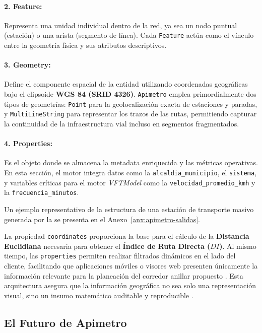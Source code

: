 \paragraph{2. Feature:} Representa una unidad individual dentro de la red, ya sea un nodo puntual (estación) o una arista (segmento de línea). Cada \texttt{Feature} actúa como el vínculo entre la geometría física y sus atributos descriptivos.

\paragraph{3. Geometry:} Define el componente espacial de la entidad utilizando coordenadas geográficas bajo el elipsoide \textbf{WGS 84 (SRID 4326)}. \texttt{Apimetro} emplea primordialmente dos tipos de geometrías: 
\texttt{Point} para la geolocalización exacta de estaciones y paradas, y \texttt{MultiLineString} para representar los trazos de las rutas, permitiendo capturar la continuidad de la infraestructura vial incluso en segmentos fragmentados.

\paragraph{4. Properties:} Es el objeto donde se almacena la metadata enriquecida y las métricas operativas. En esta sección, el motor integra datos como la \texttt{alcaldia\_municipio}, el \texttt{sistema}, y variables críticas para el motor \textit{VFTModel} 
como la \texttt{velocidad\_promedio\_kmh} y la \texttt{frecuencia\_minutos}.

Un ejemplo representativo de la estructura de una estación de transporte masivo generada por la \api{} se presenta en el Anexo~\ref{anx:apimetro-salidas}.

La propiedad \texttt{coordinates} proporciona la base para el cálculo de la \textbf{Distancia Euclidiana} necesaria para obtener el \textbf{Índice de Ruta Directa ($DI$)}. Al mismo tiempo, las \texttt{properties} permiten realizar filtrados dinámicos en el lado del cliente, facilitando que aplicaciones móviles o visores web presenten únicamente la información relevante para la planeación del corredor anillar propuesto \parencite{cabrera2025apimetro, adip_gtfs_2024}. Esta arquitectura asegura que la información geográfica no sea solo una representación visual, sino un insumo matemático auditable y reproducible \parencite{fortin2016innovative}.
\subsection{El Futuro de Apimetro}
\label{subsec:futuro-apimetro}

